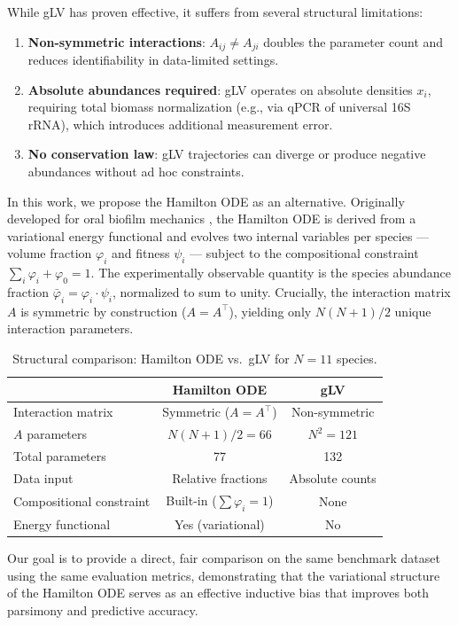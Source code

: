 \documentclass[10pt,a4paper]{article}
\begin{document}
While gLV has proven effective, it suffers from several structural limitations:
\begin{enumerate}
\item \textbf{Non-symmetric interactions}: $A_{ij} \neq A_{ji}$ doubles
the parameter count and reduces identifiability in data-limited settings.
\item \textbf{Absolute abundances required}: gLV operates on absolute
densities $x_i$, requiring total biomass normalization (e.g., via qPCR
of universal 16S rRNA), which introduces additional measurement error.
\item \textbf{No conservation law}: gLV trajectories can diverge or produce
negative abundances without ad hoc constraints.
\end{enumerate}

In this work, we propose the Hamilton ODE as an alternative. Originally
developed for oral biofilm mechanics \cite{klempt2024,nishioka2026_oral},
the Hamilton ODE is derived from a variational energy functional and
evolves two internal variables per species --- volume fraction $\varphi_i$
and fitness $\psi_i$ --- subject to the compositional constraint
$\sum_i \varphi_i + \varphi_0 = 1$. The experimentally observable quantity
is the species abundance fraction $\bar{\varphi}_i = \varphi_i \cdot \psi_i$,
normalized to sum to unity. Crucially, the interaction matrix $A$ is
symmetric by construction ($A = A^\top$), yielding only $N(N+1)/2$
unique interaction parameters.

\begin{table}[H]\centering
\caption{Structural comparison: Hamilton ODE vs.\ gLV for $N = 11$ species.}
\label{tab:comparison}
\begin{tabular}{lcc}
\toprule
& Hamilton ODE & gLV \\
\midrule
Interaction matrix & Symmetric ($A = A^\top$) & Non-symmetric \\
$A$ parameters & $N(N+1)/2 = 66$ & $N^2 = 121$ \\
Total parameters & 77 & 132 \\
Data input & Relative fractions & Absolute counts \\
Compositional constraint & Built-in ($\sum \varphi_i = 1$) & None \\
Energy functional & Yes (variational) & No \\
\bottomrule
\end{tabular}
\end{table}

Our goal is to provide a direct, fair comparison on the same benchmark
dataset using the same evaluation metrics, demonstrating that the
variational structure of the Hamilton ODE serves as an effective inductive
bias that improves both parsimony and predictive accuracy.
\end{document}
